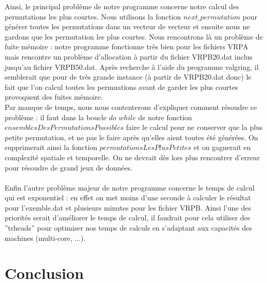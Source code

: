 \documentclass[a4paper,sffamily,12pt]{article}
\begin{document}
		\vspace{0.5cm}		

		Ainsi, le principal problème de notre programme concerne notre calcul des permutations les plus courtes. Nous utilisons la fonction $next\_permutation$ pour générer toutes les permutations dans un vecteur de vecteur et ensuite nous ne gardons que les permutation les plus courtes. Nous rencontrons là un problème de fuite mémoire : notre programme fonctionne très bien pour les fichiers VRPA mais rencontre un problème d'allocation à partir du fichier VRPB20.dat inclus jusqu'au fichier VRPB50.dat. Après recherche à l'aide du programme valgring, il semblerait que pour de très grande instance (à partir de VRPB20.dat donc) le fait que l'on calcul toutes les permuations avant de garder les plus courtes provoquent des fuites mémoire. \\
		\indent Par manque de temps, nous nous contenterons d'expliquer comment résoudre ce problème : il faut dans la boucle $do$ $while$ de notre fonction $ensemblesDesPermutationsPossibles$ faire le calcul pour ne conserver que la plus petite permutation, et ne pas le faire après qu'elles aient toutes été générées. On supprimerait ainsi la fonction $permutationsLesPlusPetites$ et on gagnerait en complexité spatiale et temporelle. On ne devrait dès lors plus rencontrer d'erreur pour résoudre de grand jeux de données.\\
		\\
		\indent Enfin l'autre problème majeur de notre programme concerne le temps de calcul qui est exponentiel : en effet on met moins d'une seconde à calculer le résultat pour l'exemble.dat et plusieurs minutes pour les fichier VRPB. Ainsi l'une des priorités serait d'améliorer le temps de calcul, il faudrait pour cela utiliser des ''trheads'' pour optimiser nos temps de calculs en s'adaptant aux capacités des machines (multi-core, ...). \\				
				
	\section{Conclusion}
	
		\vspace{0.5cm}
\end{document}
